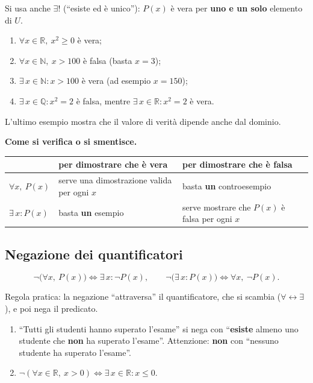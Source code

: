 \documentclass[11pt,a4paper]{article}
\begin{document}
Si usa anche $\exists!$ (``esiste ed è unico''): $P(x)$ è vera per
\textbf{uno e un solo} elemento di $U$.

\begin{esempio}\mbox{}
\begin{enumerate}
    \item $\forall x \in \mathbb{R},\ x^2 \geq 0$ \quad è vera;
    \item $\forall x \in \mathbb{N},\ x > 100$ \quad è falsa (basta
          $x = 3$);
    \item $\exists\, x \in \mathbb{N} : x > 100$ \quad è vera (ad esempio
          $x = 150$);
    \item $\exists\, x \in \mathbb{Q} : x^2 = 2$ \quad è falsa, mentre
          $\exists\, x \in \mathbb{R} : x^2 = 2$ è vera.
\end{enumerate}
\end{esempio}

L'ultimo esempio mostra che il valore di verità dipende anche dal dominio.

\textbf{Come si verifica o si smentisce.}
\begin{center}
\begin{tabular}{l|p{5.2cm}|p{5.2cm}}
 & per dimostrare che è vera & per dimostrare che è falsa \\ \hline
$\forall x,\ P(x)$ & serve una dimostrazione valida per ogni $x$ &
basta \textbf{un} controesempio \\ \hline
$\exists\, x : P(x)$ & basta \textbf{un} esempio &
serve mostrare che $P(x)$ è falsa per ogni $x$
\end{tabular}
\end{center}

\subsection{Negazione dei quantificatori}

\begin{teorema}
\[
\neg\big(\forall x,\ P(x)\big) \iff \exists\, x : \neg P(x), \qquad
\neg\big(\exists\, x : P(x)\big) \iff \forall x,\ \neg P(x).
\]
\end{teorema}

Regola pratica: la negazione ``attraversa'' il quantificatore, che si
scambia ($\forall \leftrightarrow \exists$), e poi nega il predicato.

\begin{esempio}\mbox{}
\begin{enumerate}
    \item ``Tutti gli studenti hanno superato l'esame'' si nega con
          ``\textbf{esiste} almeno uno studente che \textbf{non} ha superato
          l'esame''. Attenzione: \textbf{non} con ``nessuno studente ha
          superato l'esame''.
    \item $\neg(\forall x \in \mathbb{R},\ x > 0) \iff
          \exists\, x \in \mathbb{R} : x \leq 0$.
\end{enumerate}
\end{esempio}
\end{document}
